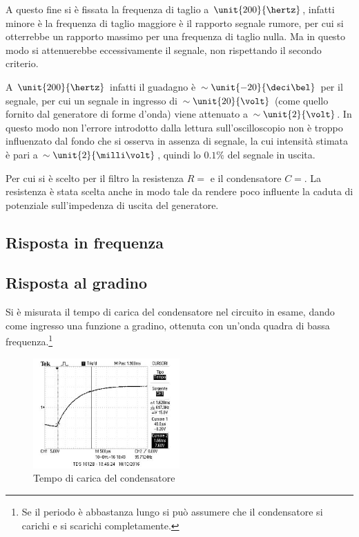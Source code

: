 \documentclass[10pt,a4paper]{article}
\begin{document}
A questo fine si è fissata la frequenza di taglio a $\unit{200}{\hertz}$, infatti minore è la frequenza di taglio maggiore è il rapporto segnale rumore, per cui si otterrebbe un rapporto massimo per una frequenza di taglio nulla. Ma in questo modo si attenuerebbe eccessivamente il segnale, non rispettando il secondo criterio.

A $\unit{200}{\hertz}$ infatti il guadagno è $\sim \unit{-20}{\deci\bel}$ per il segnale, per cui un segnale in ingresso di $\sim \unit{20}{\volt}$ (come quello fornito dal generatore di forme d'onda) viene attenuato a $\sim \unit{2}{\volt}$. In questo modo non l'errore introdotto dalla lettura sull'oscilloscopio non è troppo influenzato dal fondo che si osserva in assenza di segnale, la cui intensità stimata è pari a $\sim \unit{2}{\milli\volt}$, quindi lo $0.1\%$ del segnale in uscita.

Per cui si è scelto per il filtro la resistenza $R = $ e il condensatore $C = $. La resistenza è stata scelta anche in modo tale da rendere poco influente la caduta di potenziale sull'impedenza di uscita del generatore. 

\subsection{Risposta in frequenza}

\subsection{Risposta al gradino}
Si è misurata il tempo di carica del condensatore nel circuito in esame, dando come ingresso una funzione a gradino, ottenuta con un'onda quadra di bassa frequenza.\footnote{Se il periodo è abbastanza lungo si può assumere che il condensatore si carichi e si scarichi completamente.}

\begin{figure}[h]
	\centering
	\includegraphics[width=0.5\textwidth]{../oscilloscopio/raise_time.jpg}
	\caption{Tempo di carica del condensatore}
	\label{fig:raise}
\end{figure}
\end{document}
